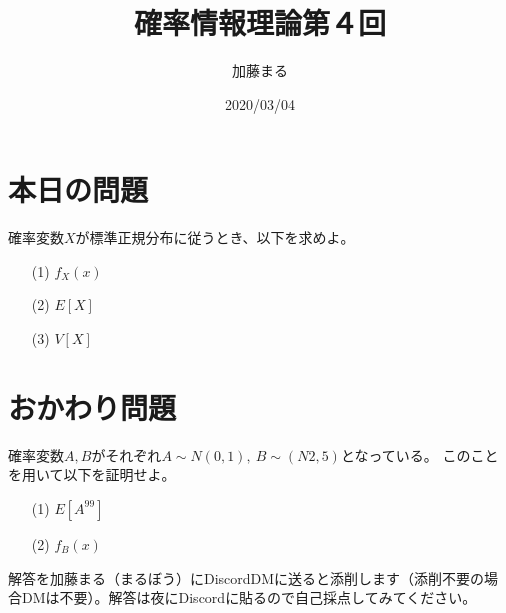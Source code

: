 \documentclass[a4j,uplatex]{jsarticle}
\title{確率情報理論第４回}
\author{加藤まる}
\date{2020/03/04}
\begin{document}
\maketitle

\section*{本日の問題}
確率変数$X$が標準正規分布に従うとき、以下を求めよ。
\begin{itemize}
  \item[(1)] $f_X(x)$
  \item[(2)] $E[X]$
  \item[(3)] $V[X]$
\end{itemize}


\section*{おかわり問題}
確率変数$A,B$がそれぞれ$A\sim N(0,1),~B\sim (N2,5)$となっている。
このことを用いて以下を証明せよ。
\begin{itemize}
  \item[(1)] $E[A^{99}]$ 
  \item[(2)] $f_B(x)$
\end{itemize}



解答を加藤まる（まるぼう）にDiscordDMに送ると添削します（添削不要の場合DMは不要）。解答は夜にDiscordに貼るので自己採点してみてください。
\end{document}
